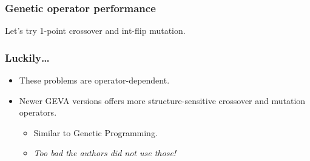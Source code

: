 \documentclass{beamer}
\begin{document}
\begin{frame}
\frametitle{Genetic operator performance}
Let's try 1-point crossover and int-flip mutation.

\vfill


\end{frame}

\begin{frame}
\frametitle{Luckily\ldots}
\begin{itemize}
\item These problems are operator-dependent.
\item Newer GEVA versions offers more structure-sensitive crossover and mutation operators.
\begin{itemize}
\item Similar to Genetic Programming.
\item \textit{Too bad the authors did not use those!}
\end{itemize}
\end{itemize}
\end{frame}
\end{document}
